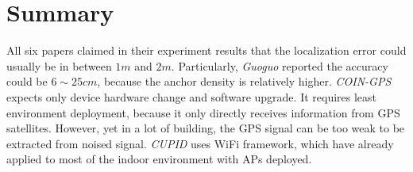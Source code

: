 \documentclass[letterpaper]{article}
\begin{document}
\section{Summary}

All six papers claimed in their experiment results that the localization error could usually be in between $ 1m $ and $ 2m $.
Particularly, \emph{Guoguo} reported the accuracy could be $ 6 \sim 25 cm $, because the anchor density is relatively higher.
\emph{COIN-GPS} expects only device hardware change and software upgrade.
It requires least environment deployment, because it only directly receives information from GPS satellites.
However, yet in a lot of building, the GPS signal can be too weak to be extracted from noised signal.
\emph{CUPID} uses WiFi framework, which have already applied to most of the indoor environment with APs deployed.


 

\end{document}
